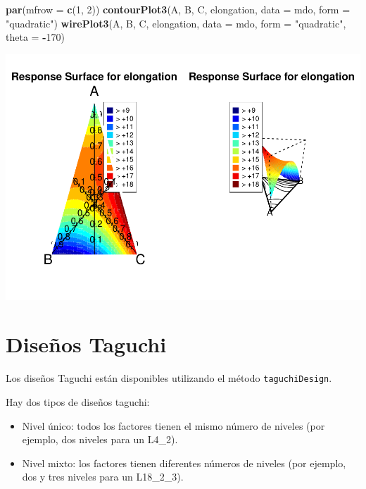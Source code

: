 \documentclass[
]{book}
\newenvironment{Shaded}{\begin{snugshade}}{\end{snugshade}}
\newcommand{\AttributeTok}[1]{\textcolor[rgb]{0.13,0.29,0.53}{#1}}
\newcommand{\DecValTok}[1]{\textcolor[rgb]{0.00,0.00,0.81}{#1}}
\newcommand{\FunctionTok}[1]{\textcolor[rgb]{0.13,0.29,0.53}{\textbf{#1}}}
\newcommand{\NormalTok}[1]{#1}
\newcommand{\SpecialCharTok}[1]{\textcolor[rgb]{0.81,0.36,0.00}{\textbf{#1}}}
\newcommand{\StringTok}[1]{\textcolor[rgb]{0.31,0.60,0.02}{#1}}
\providecommand{\tightlist}{%
  \setlength{\itemsep}{0pt}\setlength{\parskip}{0pt}}
\begin{document}
\begin{Shaded}
\begin{Highlighting}[]
\FunctionTok{par}\NormalTok{(}\AttributeTok{mfrow =} \FunctionTok{c}\NormalTok{(}\DecValTok{1}\NormalTok{, }\DecValTok{2}\NormalTok{))}
\FunctionTok{contourPlot3}\NormalTok{(A, B, C, elongation, }\AttributeTok{data =}\NormalTok{ mdo, }\AttributeTok{form =} \StringTok{"quadratic"}\NormalTok{)}
\FunctionTok{wirePlot3}\NormalTok{(A, B, C, elongation, }\AttributeTok{data =}\NormalTok{ mdo, }\AttributeTok{form =} \StringTok{"quadratic"}\NormalTok{, }\AttributeTok{theta =} \SpecialCharTok{{-}}\DecValTok{170}\NormalTok{)}
\end{Highlighting}
\end{Shaded}

\includegraphics{Libro_TidyQualityTools_files/figure-latex/unnamed-chunk-130-1.pdf}

\hypertarget{diseuxf1os-taguchi}{%
\section{Diseños Taguchi}\label{diseuxf1os-taguchi}}

Los diseños Taguchi están disponibles utilizando el método \texttt{taguchiDesign}.

Hay dos tipos de diseños taguchi:

\begin{itemize}
\tightlist
\item
  Nivel único: todos los factores tienen el mismo número de niveles (por ejemplo, dos niveles para un L4\_2).
\item
  Nivel mixto: los factores tienen diferentes números de niveles (por ejemplo, dos y tres niveles para un L18\_2\_3).
\end{itemize}
\end{document}
